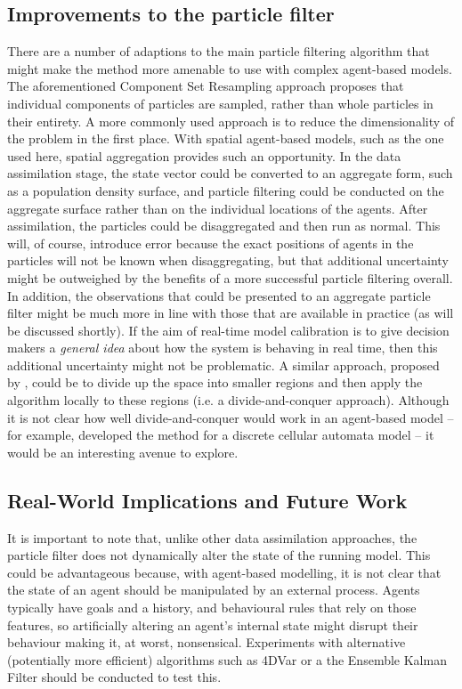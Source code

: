 \subsection{Improvements to the particle filter}

There are a number of adaptions to the main particle filtering algorithm that might make the method more amenable to use with complex agent-based models. The aforementioned Component Set Resampling \citep{wang_data_2015} approach proposes that individual components of particles are sampled, rather than whole particles in their entirety. A more commonly used approach is to reduce the dimensionality of the problem in the first place. With spatial agent-based models, such as the one used here, spatial aggregation provides such an opportunity. In the data assimilation stage, the state vector could be converted to an aggregate form, such as a population density surface, and particle filtering could be conducted on the aggregate surface rather than on the individual locations of the agents. After assimilation, the particles could be disaggregated and then run as normal. This will, of course, introduce error because the exact positions of agents in the particles will not be known when disaggregating, but that additional uncertainty might be outweighed by the benefits of a more successful particle filtering overall. In addition, the observations that could be presented to an aggregate particle filter might be much more in line with those that are available in practice (as will be discussed shortly). If the aim of real-time model calibration is to give decision makers a \textit{general idea} about how the system is behaving in real time, then this additional uncertainty might not be problematic. A similar approach, proposed by \citep{rebeschini_can_2015}, could be to divide up the space into smaller regions and then apply the algorithm locally to these regions (i.e. a divide-and-conquer approach). Although it is not clear how well divide-and-conquer would work in an agent-based model -- for example, \citep{long_spatial_2017} developed the method for a discrete cellular automata model -- it would be an interesting avenue to explore.

\subsection{Real-World Implications and Future Work}

It is important to note that, unlike other data assimilation approaches, the particle filter does not dynamically alter the state of the running model. This could be advantageous because, with agent-based modelling, it is not clear that the state of an agent should be manipulated by an external process. Agents typically have goals and a history, and behavioural rules that rely on those features, so artificially altering an agent's internal state might disrupt their behaviour making it, at worst, nonsensical. Experiments with alternative (potentially more efficient) algorithms such as 4DVar or a the Ensemble Kalman Filter should be conducted to test this. 

